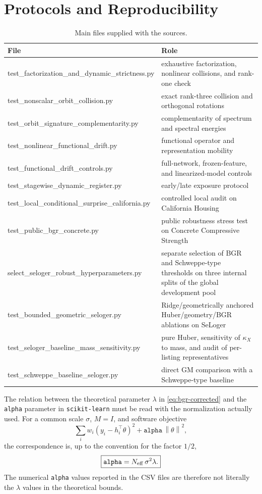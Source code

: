 \documentclass[10pt,a4paper]{article}
\newcommand{\norm}[1]{\left\lVert #1\right\rVert}
\begin{document}
\section{Protocols and Reproducibility}
\label{app:protocols}
\begin{table}[H]
\centering
\caption{Main files supplied with the sources.}
\small
\begin{tabularx}{\textwidth}{@{}>{\raggedright\arraybackslash\ttfamily\scriptsize}p{}X@{}}
\toprule
File & Role \\
\midrule
test\_factorization\_and\_dynamic\_strictness.py & exhaustive factorization, nonlinear collisions, and rank-one check \\
test\_nonscalar\_orbit\_collision.py & exact rank-three collision and orthogonal rotations \\
test\_orbit\_signature\_complementarity.py & complementarity of spectrum and spectral energies \\
test\_nonlinear\_functional\_drift.py & functional operator and representation mobility \\
test\_functional\_drift\_controls.py & full-network, frozen-feature, and linearized-model controls \\
test\_stagewise\_dynamic\_register.py & early/late exposure protocol \\
test\_local\_conditional\_surprise\_california.py & controlled local audit on California Housing \\
test\_public\_bgr\_concrete.py & public robustness stress test on Concrete Compressive Strength \\
select\_seloger\_robust\_hyperparameters.py & separate selection of BGR and Schweppe-type thresholds on three internal splits of the global development pool \\
test\_bounded\_geometric\_seloger.py & Ridge/geometrically anchored Huber/geometry/BGR ablations on SeLoger \\
test\_seloger\_baseline\_mass\_sensitivity.py & pure Huber, sensitivity of $\kappa_X$ to mass, and audit of per-listing representatives \\
test\_schweppe\_baseline\_seloger.py & direct GM comparison with a Schweppe-type baseline \\
\bottomrule
\end{tabularx}
\end{table}
The relation between the theoretical parameter $\lambda$ in \eqref{eq:bgr-corrected} and the \texttt{alpha} parameter in \texttt{scikit-learn} must be read with the normalization actually used. For a common scale $\sigma$, $M=I$, and software objective
\[
\sum_i w_i(y_i-h_i^\top\theta)^2+\texttt{alpha}\,\norm\theta^2,
\]
the correspondence is, up to the convention for the factor $1/2$,
\[
\boxed{\texttt{alpha}=N_{\rm eff}\,\sigma^2\lambda.}
\]
The numerical \texttt{alpha} values reported in the CSV files are therefore not literally the $\lambda$ values in the theoretical bounds.
\end{document}
